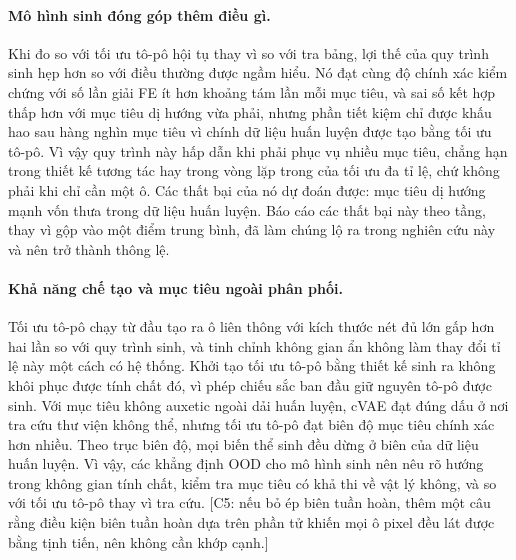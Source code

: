 \paragraph{Mô hình sinh đóng góp thêm điều gì.}
Khi đo so với tối ưu tô-pô hội tụ thay vì so với tra bảng, lợi thế của quy
trình sinh hẹp hơn so với điều thường được ngầm hiểu. Nó đạt cùng độ chính
xác kiểm chứng với số lần giải FE ít hơn khoảng tám lần mỗi mục tiêu, và sai
số kết hợp thấp hơn với mục tiêu dị hướng vừa phải, nhưng phần tiết kiệm chỉ
được khấu hao sau hàng nghìn mục tiêu vì chính dữ liệu huấn luyện được tạo
bằng tối ưu tô-pô. Vì vậy quy trình này hấp dẫn khi phải phục vụ nhiều mục
tiêu, chẳng hạn trong thiết kế tương tác hay trong vòng lặp trong của tối ưu
đa tỉ lệ, chứ không phải khi chỉ cần một ô. Các thất bại của nó dự đoán được:
mục tiêu dị hướng mạnh vốn thưa trong dữ liệu huấn luyện. Báo cáo các thất
bại này theo tầng, thay vì gộp vào một điểm trung bình, đã làm chúng lộ ra
trong nghiên cứu này và nên trở thành thông lệ.

\paragraph{Khả năng chế tạo và mục tiêu ngoài phân phối.}
Tối ưu tô-pô chạy từ đầu tạo ra ô liên thông với kích thước nét đủ lớn gấp
hơn hai lần so với quy trình sinh, và tinh chỉnh không gian ẩn không
làm thay đổi tỉ lệ này một cách có hệ thống. Khởi tạo tối ưu tô-pô bằng thiết kế sinh ra không khôi phục
được tính chất đó, vì phép chiếu sắc ban đầu giữ nguyên tô-pô được sinh. Với
mục tiêu không auxetic ngoài dải huấn luyện, cVAE đạt đúng dấu ở nơi tra cứu
thư viện không thể, nhưng tối ưu tô-pô đạt biên độ mục tiêu chính xác hơn
nhiều. Theo trục biên độ, mọi biến thể sinh đều dừng ở biên của dữ liệu huấn
luyện. Vì vậy, các khẳng định OOD cho mô hình sinh nên nêu rõ hướng trong
không gian tính chất, kiểm tra mục tiêu có khả thi về vật lý không, và so với
tối ưu tô-pô thay vì tra cứu. [C5: nếu bỏ ép biên tuần hoàn, thêm một câu rằng
điều kiện biên tuần hoàn dựa trên phần tử khiến mọi ô pixel đều lát được bằng
tịnh tiến, nên không cần khớp cạnh.]
